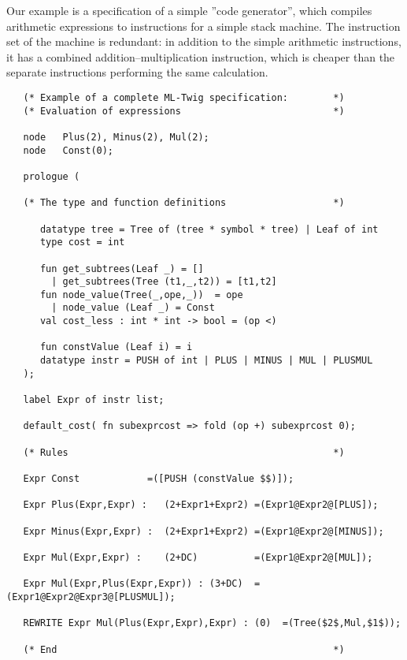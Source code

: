 Our example is a specification of a simple ''code generator'', which
compiles arithmetic expressions to instructions for a simple stack machine.
The instruction set of the machine is redundant: in addition to the simple
arithmetic instructions, it has a combined addition--multiplication
instruction, which is cheaper than the separate instructions
performing the same calculation.
\newpage
\begin{verbatim}
   (* Example of a complete ML-Twig specification:        *)
   (* Evaluation of expressions                           *)

   node   Plus(2), Minus(2), Mul(2);
   node   Const(0);

   prologue (
   
   (* The type and function definitions                   *)

      datatype tree = Tree of (tree * symbol * tree) | Leaf of int
      type cost = int

      fun get_subtrees(Leaf _) = []
        | get_subtrees(Tree (t1,_,t2)) = [t1,t2]
      fun node_value(Tree(_,ope,_))  = ope
        | node_value (Leaf _) = Const
      val cost_less : int * int -> bool = (op <)

      fun constValue (Leaf i) = i
      datatype instr = PUSH of int | PLUS | MINUS | MUL | PLUSMUL
   );

   label Expr of instr list;
   
   default_cost( fn subexprcost => fold (op +) subexprcost 0);

   (* Rules                                               *)

   Expr Const            =([PUSH (constValue $$)]);
   
   Expr Plus(Expr,Expr) :   (2+Expr1+Expr2) =(Expr1@Expr2@[PLUS]);
   
   Expr Minus(Expr,Expr) :  (2+Expr1+Expr2) =(Expr1@Expr2@[MINUS]);
   
   Expr Mul(Expr,Expr) :    (2+DC)          =(Expr1@Expr2@[MUL]);

   Expr Mul(Expr,Plus(Expr,Expr)) : (3+DC)  =(Expr1@Expr2@Expr3@[PLUSMUL]);

   REWRITE Expr Mul(Plus(Expr,Expr),Expr) : (0)  =(Tree($2$,Mul,$1$));
   
   (* End                                                 *)
\end{verbatim}   
\newpage   
